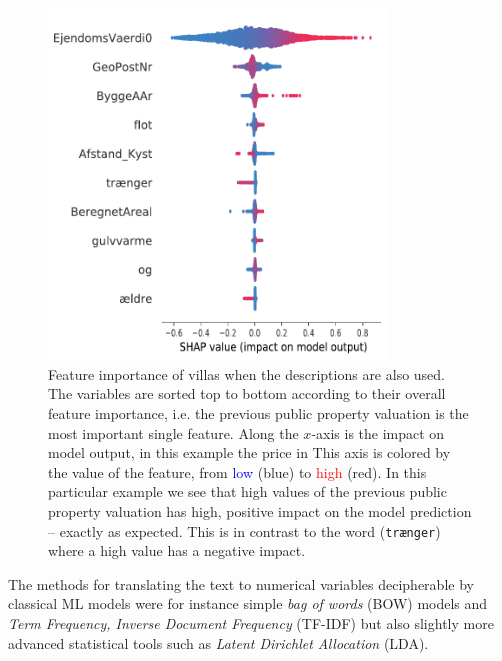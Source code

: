 \begin{figure}[h!]
  \centering
  \includegraphics[width=0.8\textwidth]{figures/housing_text/villa_tfidf.pdf}
  \caption[Feature Importance of Villas With Descriptions]
          {Feature importance of villas when the descriptions are also used. The variables are sorted top to bottom according to their overall feature importance, i.e. the previous public property valuation  is the most important single feature. Along the $x$-axis is the impact on model output, in this example the price in \si{\Mkr} This axis is colored by the value of the feature, from \textcolor{blue}{low} (blue) to \textcolor{red}{high} (red). In this particular example we see that high values of the previous public property valuation has high, positive impact on the model prediction -- exactly as expected. This is in contrast to the word  (\colorbox{light-gray}{\texttt{trænger}}) where a high value has a negative impact.} 
  \label{fig:h:shap_text}
\end{figure}

The methods for translating the text to numerical variables decipherable by classical ML models were for instance simple \emph{bag of words} (BOW) models and \emph{Term Frequency, Inverse Document Frequency} (TF-IDF) but also slightly more advanced statistical tools such as \emph{Latent Dirichlet Allocation} (LDA). 

